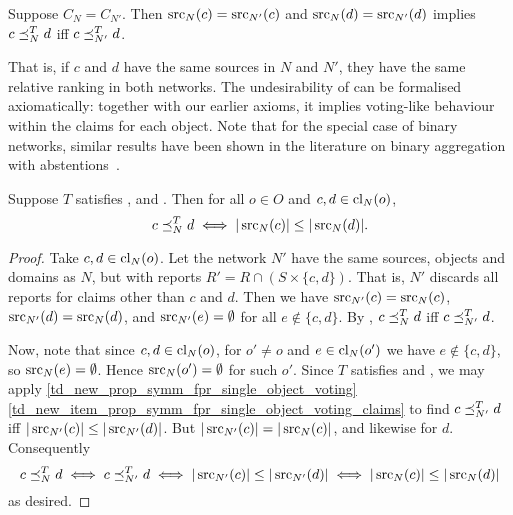 \begin{axiom}[\classicalindependence{}]
    Suppose $C_N = C_{N'}$. Then $\operatorname{src}_N(c) = \operatorname{src}_{N'}(c)$ and $\operatorname{src}_N(d) =
    \operatorname{src}_{N'}(d)$ implies $c \preceq_N^T d$ iff $c \preceq_{N'}^T d$.
\end{axiom}

That is, if $c$ and $d$ have the same sources in $N$ and $N'$, they have the
same relative ranking in both networks. The undesirability of
\classicalindependence{} can be formalised axiomatically: together with our
earlier axioms, it implies voting-like behaviour within the claims for each
object.\footnotemark{} Note that for the special case of binary networks,
similar results have been shown in the literature on binary aggregation with
abstentions~\cite{christoffbinary}.


\begin{proposition}
    \label{td_new_prop_symm_fpr_ci_voting}
    Suppose $T$ satisfies \symmetry{}, \freshposresp{} and
    \classicalindependence{}. Then for all $o \in O$ and $c, d \in
    \operatorname{cl}_N(o)$,
    \[
        c \preceq_N^T d \iff |\operatorname{src}_N(c)| \le |\operatorname{src}_N(d)|.
    \]
\end{proposition}

\begin{proof}
    Take $c, d \in \operatorname{cl}_N(o)$. Let the network $N'$ have the same sources,
    objects and domains as $N$, but with reports $R' = R \cap (S \times \{c,
    d\})$. That is, $N'$ discards all reports for claims other than $c$ and
    $d$. Then we have $\operatorname{src}_{N'}(c) = \operatorname{src}_N(c)$, $\operatorname{src}_{N'}(d) = \operatorname{src}_N(d)$,
    and $\operatorname{src}_{N'}(e) = \emptyset$ for all $e \notin \{c, d\}$. By
    \classicalindependence{}, $c \preceq_N^T d$ iff $c \preceq_{N'}^T d$.

    Now, note that since $c, d \in \operatorname{cl}_N(o)$, for $o' \ne o$ and $e \in
    \operatorname{cl}_N(o')$ we have $e \notin \{c, d\}$, so $\operatorname{src}_N(e) = \emptyset$.
    Hence $\operatorname{src}_N(o') = \emptyset$ for such $o'$. Since $T$ satisfies
    \symmetry{} and \freshposresp{}, we may apply
    \cref{td_new_prop_symm_fpr_single_object_voting}
    \cref{td_new_item_prop_symm_fpr_single_object_voting_claims} to find $c
    \preceq_{N'}^T d$ iff $|\operatorname{src}_{N'}(c)| \le |\operatorname{src}_{N'}(d)|$. But $|\operatorname{src}_{N'}(c)|
    = |\operatorname{src}_N(c)|$, and likewise for $d$. Consequently
    \[
        c \preceq_N^T d
        \iff c \preceq_{N'}^T d
        \iff |\operatorname{src}_{N'}(c)| \le |\operatorname{src}_{N'}(d)|
        \iff |\operatorname{src}_{N}(c)| \le |\operatorname{src}_{N}(d)|
    \]
    as desired.
\end{proof}

